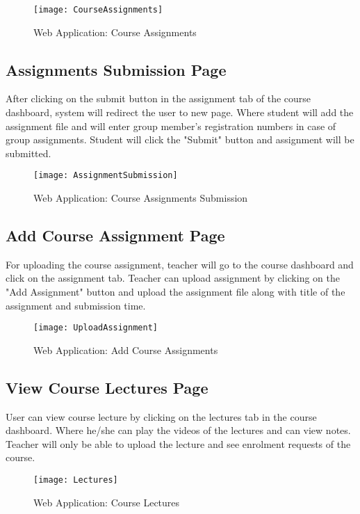 \begin{figure}[h]
  \centering
  \texttt{[image: CourseAssignments]}
  \caption{Web Application: Course Assignments}
\end{figure}

\subsection{Assignments Submission Page}
After clicking on the submit button in the assignment tab of the course dashboard, system will redirect the user to new page. Where student will add the assignment file and will enter group member's registration numbers in case of group assignments.  Student will click the "Submit" button and assignment will be submitted.

\begin{figure}[h]
  \centering
  \texttt{[image: AssignmentSubmission]}
  \caption{Web Application: Course Assignments Submission}
\end{figure}

\subsection{Add Course Assignment Page}
For uploading the course assignment, teacher will go to the course dashboard and click on the assignment tab. Teacher can upload assignment by clicking on the "Add Assignment" button and upload the assignment file along with title of the assignment and submission time.

\begin{figure}[h]
  \centering
  \texttt{[image: UploadAssignment]}
  \caption{Web Application: Add Course Assignments}
\end{figure}

\subsection{View Course Lectures Page}
User can view course lecture by clicking on the lectures tab in the course dashboard. Where he/she can play the videos of the lectures and can view notes. Teacher will only be able to upload the lecture and see enrolment requests of the course.

\begin{figure}[h]
  \centering
  \texttt{[image: Lectures]}
  \caption{Web Application: Course Lectures}
\end{figure}


